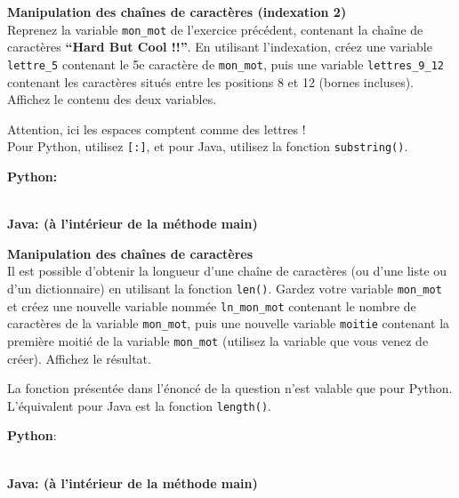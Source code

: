 \begin{Exercice} \textbf{Manipulation des chaînes de caractères (indexation 2)}\\
   Reprenez la variable \texttt{mon\_mot} de l'exercice précédent, contenant la chaîne de caractères \textbf{``Hard But Cool !!''}. En utilisant l'indexation, créez une variable \texttt{lettre\_5} contenant le 5e caractère de \texttt{mon\_mot}, puis une variable \texttt{lettres\_9\_12} contenant les caractères situés entre les positions 8 et 12 (bornes incluses). Affichez le contenu des deux variables. \\
   
    \begin{conseil}
      	Attention, ici les espaces comptent comme des lettres ! \\

		Pour Python, utilisez \lstinline{[:]}, et pour Java, utilisez la fonction \lstinline{substring()}.
        
    \end{conseil}
    \begin{solution}
    
    \textbf{Python:}    
    
    
    \textbf{\\Java: (à l'intérieur de la méthode main)}
    
           
    \end{solution}   
\end{Exercice}
\begin{Exercice} \textbf{Manipulation des chaînes de caractères \optionnel}\\
   Il est possible d'obtenir la longueur d'une chaîne de caractères (ou d'une liste ou d'un dictionnaire) en utilisant la fonction \lstinline{len()}. Gardez votre variable \texttt{mon\_mot} et créez une nouvelle variable nommée \texttt{ln\_mon\_mot} contenant le nombre de caractères de la variable \texttt{mon\_mot}, puis une nouvelle variable \texttt{moitie} contenant la première moitié de la variable \texttt{mon\_mot} (utilisez la variable que vous venez de créer). Affichez le résultat.   \\
   
    \begin{conseil}
      	La fonction présentée dans l'énoncé de la question n'est valable que pour Python. L'équivalent pour Java est la fonction \lstinline{length()}.
        
    \end{conseil}
    \begin{solution}
    
    \textbf{Python}:
    
    
    \textbf{\\Java: (à l'intérieur de la méthode main)}
    
    \end{solution}   
\end{Exercice}

